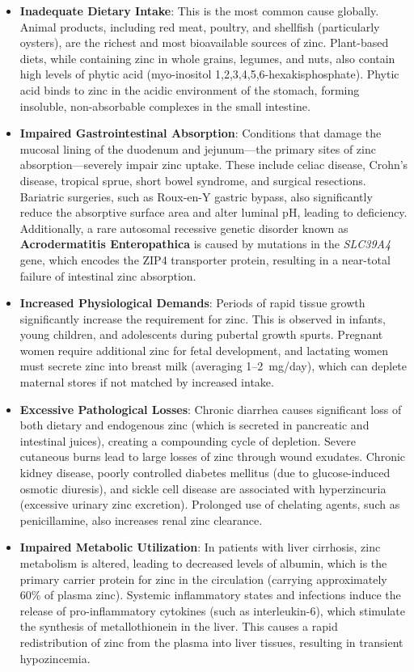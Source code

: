 \begin{itemize}
    \item \textbf{Inadequate Dietary Intake}: This is the most common cause globally. Animal products, including red meat, poultry, and shellfish (particularly oysters), are the richest and most bioavailable sources of zinc. Plant-based diets, while containing zinc in whole grains, legumes, and nuts, also contain high levels of phytic acid (myo-inositol 1,2,3,4,5,6-hexakisphosphate). Phytic acid binds to zinc in the acidic environment of the stomach, forming insoluble, non-absorbable complexes in the small intestine.
    \item \textbf{Impaired Gastrointestinal Absorption}: Conditions that damage the mucosal lining of the duodenum and jejunum—the primary sites of zinc absorption—severely impair zinc uptake. These include celiac disease, Crohn's disease, tropical sprue, short bowel syndrome, and surgical resections. Bariatric surgeries, such as Roux-en-Y gastric bypass, also significantly reduce the absorptive surface area and alter luminal pH, leading to deficiency. Additionally, a rare autosomal recessive genetic disorder known as \textbf{Acrodermatitis Enteropathica} is caused by mutations in the \textit{SLC39A4} gene, which encodes the ZIP4 transporter protein, resulting in a near-total failure of intestinal zinc absorption.
    \item \textbf{Increased Physiological Demands}: Periods of rapid tissue growth significantly increase the requirement for zinc. This is observed in infants, young children, and adolescents during pubertal growth spurts. Pregnant women require additional zinc for fetal development, and lactating women must secrete zinc into breast milk (averaging 1--2~mg/day), which can deplete maternal stores if not matched by increased intake.
    \item \textbf{Excessive Pathological Losses}: Chronic diarrhea causes significant loss of both dietary and endogenous zinc (which is secreted in pancreatic and intestinal juices), creating a compounding cycle of depletion. Severe cutaneous burns lead to large losses of zinc through wound exudates. Chronic kidney disease, poorly controlled diabetes mellitus (due to glucose-induced osmotic diuresis), and sickle cell disease are associated with hyperzincuria (excessive urinary zinc excretion). Prolonged use of chelating agents, such as penicillamine, also increases renal zinc clearance.
    \item \textbf{Impaired Metabolic Utilization}: In patients with liver cirrhosis, zinc metabolism is altered, leading to decreased levels of albumin, which is the primary carrier protein for zinc in the circulation (carrying approximately 60\% of plasma zinc). Systemic inflammatory states and infections induce the release of pro-inflammatory cytokines (such as interleukin-6), which stimulate the synthesis of metallothionein in the liver. This causes a rapid redistribution of zinc from the plasma into liver tissues, resulting in transient hypozincemia.
\end{itemize}


